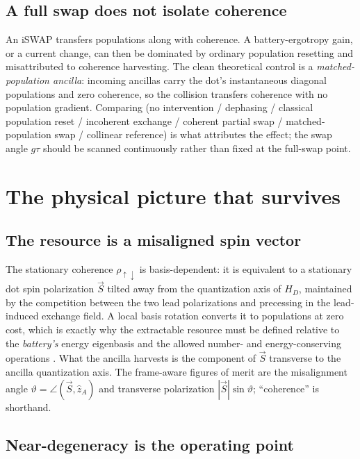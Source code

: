 \documentclass[11pt,a4paper]{article}
\newcommand{\up}{\uparrow}
\newcommand{\dn}{\downarrow}
\begin{document}
\subsection{A full swap does not isolate coherence}

An iSWAP transfers populations along with coherence. A battery-ergotropy gain, or a current change, can then be dominated by ordinary population resetting and misattributed to coherence harvesting. The clean theoretical control is a \emph{matched-population ancilla}: incoming ancillas carry the dot's instantaneous diagonal populations and zero coherence, so the collision transfers coherence with no population gradient. Comparing (no intervention / dephasing / classical population reset / incoherent exchange / coherent partial swap / matched-population swap / collinear reference) is what attributes the effect; the swap angle $g\tau$ should be scanned continuously rather than fixed at the full-swap point.

\section{The physical picture that survives}\label{sec:picture}

\subsection{The resource is a misaligned spin vector}

The stationary coherence $\rho_{\up\dn}$ is basis-dependent: it is equivalent to a stationary dot spin polarization $\vec S$ tilted away from the quantization axis of $H_D$, maintained by the competition between the two lead polarizations and precessing in the lead-induced exchange field. A local basis rotation converts it to populations at zero cost, which is exactly why the extractable resource must be defined relative to the \emph{battery's} energy eigenbasis and the allowed number- and energy-conserving operations \cite{RefFrames}. What the ancilla harvests is the component of $\vec S$ transverse to the ancilla quantization axis. The frame-aware figures of merit are the misalignment angle $\vartheta=\angle(\vec S,\hat z_A)$ and transverse polarization $|\vec S|\sin\vartheta$; ``coherence'' is shorthand.

\subsection{Near-degeneracy is the operating point}
\end{document}
